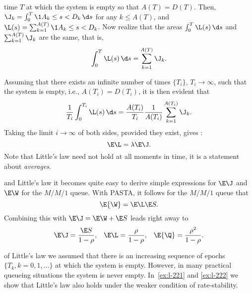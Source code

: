  time $T$ at which the system is empty so that $A(T) = D(T)$.
Then, $ \J_k = \int_0^T \1{A_k \leq s < D_k}\,\d s$ for any $k\leq A(T)$,
and $\L(s) = \sum_{k=1}^{A(T)}\1{A_k \leq s < D_k}$.
Now realize that the areas $\int_0^T \L(s)\, \d s$ and $\sum_{k=1}^{A(T)} \J_k$ are the same, that is,
\begin{equation}\label{eq:111}
 \int_0^T \L(s)\, \d s = \sum_{k=1}^{A(T)} \J_k.
\end{equation}

Assuming that there exists an infinite number of times $\{T_i\}$,  $T_i\to\infty$, such that the system is empty, i.e.,  $A(T_i) = D(T_i)$, it is then evident that
\begin{equation*}
 \frac 1 {T_i} \int_0^{T_i} \L(s)\, \d s = \frac{A(T_i)} {T_i} \frac{1}{A(T_i)} \sum_{k=1}^{A(T_i)} \J_k.
\end{equation*}
Taking the limit $i\to\infty$ of both sides, provided they exist, gives :
\begin{equation*}
 \E \L = \lambda \E \J.
\end{equation*}
Note that Little's law need not hold at all moments in time, it is a statement about \emph{averages}.


 and Little's law it becomes quite easy to derive simple expressions for $\E \J$ and $\E\W$ for the $M/M/1$ queue.
With PASTA, it follows for the $M/M/1$ queue that
\begin{equation}\label{eq:wqes}
 \E{\W} = \E \L \E S.
\end{equation}
Combining this with $\E\J = \E \W + \E S$ leads right away to
 \begin{align}\label{eq:110}
 \E\J &= \frac{\E S}{1-\rho}, & \E \L &= \frac\rho{1-\rho}, & \E{\Q} = \frac{\rho^2}{1-\rho}.
 \end{align}


  of Little's law we assumed that there is an increasing sequence of epochs $\{T_k, k=0,1,\ldots\}$ at which the system is empty.
 However, in many practical queueing situations the system is never empty.
 In~\cref{ex:l-221} and \cref{ex:l-222} we show that Little's law also  holds under the weaker condition of rate-stability.



